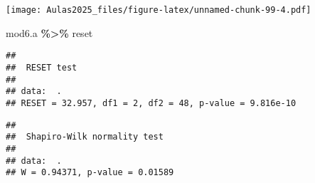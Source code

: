 \documentclass[
]{book}
\newenvironment{Shaded}{\begin{snugshade}}{\end{snugshade}}
\newcommand{\CommentTok}[1]{\textcolor[rgb]{0.56,0.35,0.01}{\textit{#1}}}
\newcommand{\DecValTok}[1]{\textcolor[rgb]{0.00,0.00,0.81}{#1}}
\newcommand{\FunctionTok}[1]{\textcolor[rgb]{0.13,0.29,0.53}{\textbf{#1}}}
\newcommand{\NormalTok}[1]{#1}
\newcommand{\OtherTok}[1]{\textcolor[rgb]{0.56,0.35,0.01}{#1}}
\newcommand{\SpecialCharTok}[1]{\textcolor[rgb]{0.81,0.36,0.00}{\textbf{#1}}}
\begin{document}
\begin{Shaded}
\end{Shaded}

\texttt{[image: Aulas2025\_files/figure-latex/unnamed-chunk-99-4.pdf]}

\begin{Shaded}
\begin{Highlighting}[]
\NormalTok{mod6.a }\SpecialCharTok{\%\textgreater{}\%}
\NormalTok{    reset}
\end{Highlighting}
\end{Shaded}

\begin{verbatim}
## 
##  RESET test
## 
## data:  .
## RESET = 32.957, df1 = 2, df2 = 48, p-value = 9.816e-10
\end{verbatim}

\begin{Shaded}
\end{Shaded}

\begin{verbatim}
## 
##  Shapiro-Wilk normality test
## 
## data:  .
## W = 0.94371, p-value = 0.01589
\end{verbatim}

\begin{Shaded}
\end{Shaded}
\end{document}
